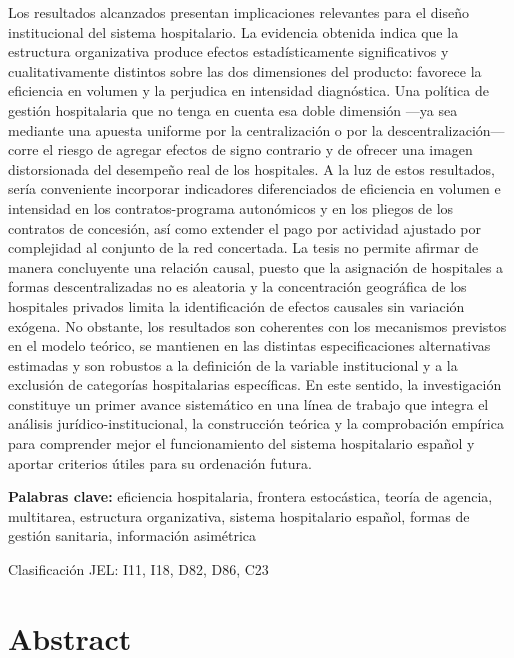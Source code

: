 Los resultados alcanzados presentan implicaciones relevantes para el diseño institucional del sistema hospitalario. La evidencia obtenida indica que la estructura organizativa produce efectos estadísticamente significativos y cualitativamente distintos sobre las dos dimensiones del producto: favorece la eficiencia en volumen y la perjudica en intensidad diagnóstica. Una política de gestión hospitalaria que no tenga en cuenta esa doble dimensión —ya sea mediante una apuesta uniforme por la centralización o por la descentralización— corre el riesgo de agregar efectos de signo contrario y de ofrecer una imagen distorsionada del desempeño real de los hospitales. A la luz de estos resultados, sería conveniente incorporar indicadores diferenciados de eficiencia en volumen e intensidad en los contratos-programa autonómicos y en los pliegos de los contratos de concesión, así como extender el pago por actividad ajustado por complejidad al conjunto de la red concertada. La tesis no permite afirmar de manera concluyente una relación causal, puesto que la asignación de hospitales a formas descentralizadas no es aleatoria y la concentración geográfica de los hospitales privados limita la identificación de efectos causales sin variación exógena. No obstante, los resultados son coherentes con los mecanismos previstos en el modelo teórico, se mantienen en las distintas especificaciones alternativas estimadas y son robustos a la definición de la variable institucional y a la exclusión de categorías hospitalarias específicas. En este sentido, la investigación constituye un primer avance sistemático en una línea de trabajo que integra el análisis jurídico-institucional, la construcción teórica y la comprobación empírica para comprender mejor el funcionamiento del sistema hospitalario español y aportar criterios útiles para su ordenación futura.

\medskip
\noindent\textbf{Palabras clave:} eficiencia hospitalaria, frontera estocástica, teoría de agencia, multitarea, estructura organizativa, sistema hospitalario español, formas de gestión sanitaria, información asimétrica

\medskip
\noindent Clasificación JEL: I11, I18, D82, D86, C23

\chapter*{Abstract}


